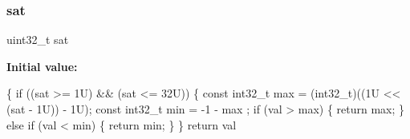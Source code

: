 \subsubsection{\texorpdfstring{sat}{sat}}
{\footnotesize\ttfamily uint32\+\_\+t sat}

{\bfseries Initial value\+:}
\begin{DoxyCode}
\{
  \textcolor{keywordflow}{if} ((sat >= 1U) && (sat <= 32U))
  \{
    \textcolor{keyword}{const} int32\_t max = (int32\_t)((1U << (sat - 1U)) - 1U);
    \textcolor{keyword}{const} int32\_t min = -1 - max ;
    \textcolor{keywordflow}{if} (val > max)
    \{
      \textcolor{keywordflow}{return} max;
    \}
    \textcolor{keywordflow}{else} \textcolor{keywordflow}{if} (val < min)
    \{
      \textcolor{keywordflow}{return} min;
    \}
  \}
  \textcolor{keywordflow}{return} val
\end{DoxyCode}
